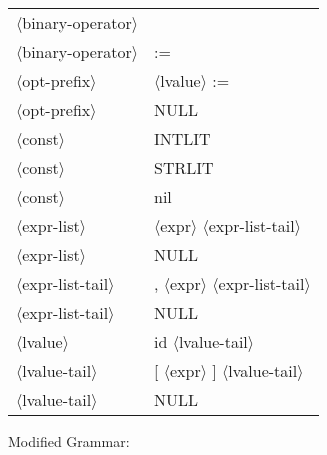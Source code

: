 \documentclass[11pt, fleqn]{article}
\newcommand{\atag}[1]{$\langle$#1$\rangle$}
\begin{document}
\begin{longtable}{l|l}
\atag{binary-operator}			&	\textbar		\\
\atag{binary-operator}			&	:=	\\
\atag{opt-prefix}				&	\atag{lvalue} :=		\\
\atag{opt-prefix}				&	NULL		\\
\atag{const}						&	INTLIT		\\
\atag{const}						&	STRLIT		\\
\atag{const}						&	nil		\\
\atag{expr-list}					&	\atag{expr} \atag{expr-list-tail}		\\
\atag{expr-list}					&	NULL		\\
\atag{expr-list-tail}			&	, \atag{expr} \atag{expr-list-tail}		\\
\atag{expr-list-tail}			&	NULL		\\
\atag{lvalue}					&	id \atag{lvalue-tail}		\\
\atag{lvalue-tail}				&	[ \atag{expr} ] \atag{lvalue-tail}		\\
\atag{lvalue-tail}				&	NULL		\\
\end{longtable}

Modified Grammar:
\end{document}
